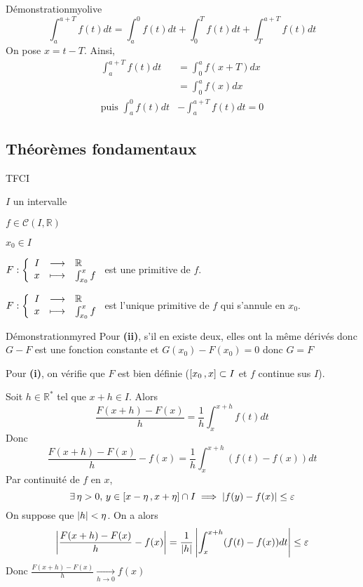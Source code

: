     \begin{demo}{Démonstration}{myolive}
        \[ \int_{a}^{a+T} f(t)dt = \int_{a}^{0} f(t)dt + \int_{0}^{T} f(t)dt + \int_{T}^{a+T} f(t)dt \] 
        On pose $x = t-T$. Ainsi,\begin{align*}
            \int_{a}^{a+T} f(t)dt & = \int_{0}^{a} f(x+T)dx \\
            &= \int_{0}^{a} f(x)dx \\
            \text{puis } \int_{a}^{0} f(t)dt &- \int_{a}^{a+T} f(t)dt = 0 
        \end{align*}
    \end{demo}

    \subsection{Théorèmes fondamentaux}

    \begin{theo}{TFCI}{}
        \begin{soient}
            \item $I$ un intervalle
            \item $f \in \mathcal{C}(I,\mathbb{R})$
            \item $x_0 \in I$
        \end{soient}
        \begin{alors}
            \item $\fonction{F}{I}{\mathbb{R}}{x}{\int_{x_0}^{x}f}$ est une primitive de $f$.
            \item $\fonction{F}{I}{\mathbb{R}}{x}{\int_{x_0}^{x}f}$ est l’unique primitive de $f$ qui s’annule en $x_0$.
        \end{alors}
    \end{theo}

    \begin{demo}{Démonstration}{myred}
        Pour \textbf{(ii)}, s’il en existe deux, elles ont la même dérivés donc $G - F$ est une fonction constante et $G(x_0) - F(x_0) = 0$ donc $G=F$
        
        Pour \textbf{(i)}, on vérifie que $F$ est bien définie ($\left[ x_0 \, , x \right] \subset I$ et $f$ continue sus $I$).
        
        Soit $h \in \mathbb{R}^*$ tel que $x + h \in I$. Alors 
        \[ \frac{F(x+h)-F(x)}{h} = \frac{1}{h} \int_{x}^{x+h}f(t)dt \] 
        Donc 
        \[ \frac{F(x+h)-F(x)}{h} - f(x) = \frac{1}{h} \int_{x}^{x+h}(f(t)- f(x))dt \] 
        Par continuité de $f$ en $x$, \[ \exists \, \eta > 0, \, y \in \left[ x-\eta \, , x+\eta \right] \cap I \implies \left\lvert f(y)-f(x)\right\rvert \leq \varepsilon \] 
        On suppose que $\left\lvert h\right\rvert < \eta$. On a alors 
        \[ \left\lvert \frac{F(x+h)-F(x)}{h} - f(x)\right\rvert = \frac{1}{\left\lvert h\right\rvert} \left\lvert \int_{x}^{x+h}(f(t)- f(x))dt\right\rvert \leq \varepsilon \] 
        Donc $ \frac{F(x+h)-F(x)}{h} \underset{h \rightarrow 0}{\longrightarrow} f(x) $
    \end{demo}

